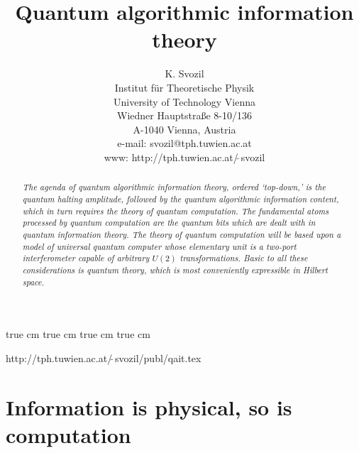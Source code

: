 \def\cal{\frak }
\topmargin -45pt
 true cm
 true cm
 true cm
 true cm
\sloppy

\title{Quantum algorithmic information theory}
\author{K. Svozil\\
 {\small Institut f\"ur Theoretische Physik}  \\
  {\small University of Technology Vienna }     \\
  {\small Wiedner Hauptstra\ss e 8-10/136}    \\
  {\small A-1040 Vienna, Austria   }            \\
  {\small e-mail: svozil@tph.tuwien.ac.at}\\
  {\small www: http://tph.tuwien.ac.at/$\widetilde{\;}$svozil}}
\date{ }
\maketitle

\begin{flushright}
{\scriptsize
http://tph.tuwien.ac.at/$\widetilde{\;}$svozil/publ/qait.tex}
\end{flushright}

\begin{abstract}
{\em
The agenda of quantum
algorithmic information theory, ordered `top-down,'
is the quantum halting amplitude, followed by the
quantum algorithmic information content, which in
turn requires the theory of quantum computation. The fundamental atoms
processed by quantum computation are the quantum bits
which are dealt with in
 quantum information theory.
The theory of quantum computation will be based upon a model
of universal quantum computer whose elementary unit is a two-port
interferometer capable of arbitrary $U(2)$ transformations.
Basic to all these considerations is quantum theory, which is most
conveniently expressible in Hilbert space.
}
\end{abstract}



\section{Information is physical, so is computation}



